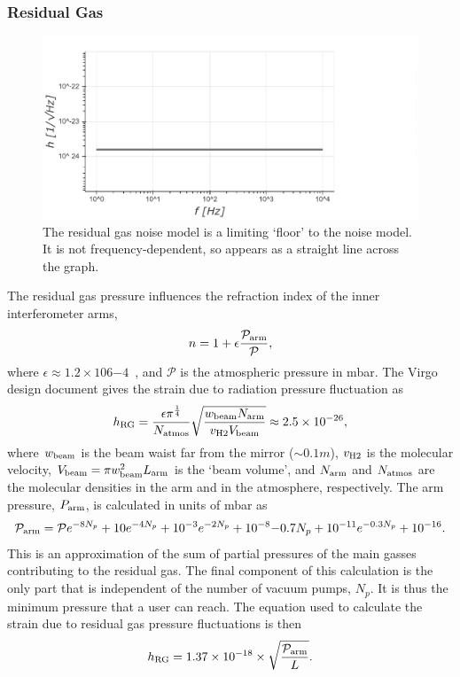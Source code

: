 \documentclass{article}
\begin{document}
     \subsubsection*{Residual Gas} 
    \begin{figure}[h!]
    \centering
    \hspace{2cm}
    \includegraphics[height=0.35\textwidth]{SPQ_residualgas.pdf}
    \caption{The residual gas noise model is a limiting `floor' to the
      noise model. It is not frequency-dependent, so appears as a
      straight line across the graph.}
    \label{fig:residual}
    \end{figure}
    The residual gas pressure influences the refraction index of the inner interferometer arms, 
    \begin{equation}
    n = 1 + \epsilon\frac{\mathcal{P}_{\rm arm}}{\mathcal{P}},
    \end{equation}
    where $\epsilon \approx 1.2\times 10 6{-4}$~\cite{Virgo-sens}, and
    $\mathcal{P}$ is the atmospheric pressure in mbar. The Virgo
    design document gives the strain due to radiation pressure
    fluctuation as
    \begin{equation}
    h_{\rm RG} = \frac{\epsilon\pi^{\frac{1}{4}}}{N_{\rm atmos}}\sqrt{\frac{w_{\rm beam}N_{\rm arm}}{v_{\rm H2}V_{\rm beam}}} \approx 2.5 \times 10^{-26},
    \end{equation}
    where $w_{\rm beam}$ is the beam waist far from the mirror ($\sim
    0.1m$), $v_{\rm H2}$ is the molecular velocity, $V_{\rm beam} = \pi
    w_{\rm beam}^2L_{\rm arm}$ is the `beam volume', and $N_{\rm arm}$ and
    $N_{\rm atmos}$ are the molecular densities in the arm and in the
    atmosphere, respectively.
    The arm pressure, $P_{\rm arm}$, is calculated in units of mbar as
    \begin{equation}
    \label{eq:pressure}
    \mathcal{P}_{\rm arm} = \mathcal{P}e^{-8N_p} + 10e^{-4N_p} + 10^{-3}e^{-2N_p} + 10^{-8}{-0.7N_p} + 10^{-11}e^{-0.3N_p} + 10^{-16}.
    \end{equation}
   This is an approximation of the sum of partial pressures of the
   main gasses contributing to the residual gas. The final component
   of this calculation is the only part that is independent of the
   number of vacuum pumps, $N_p$. It is thus the minimum pressure that
   a user can reach.
    The equation used to calculate the strain due to residual gas
    pressure fluctuations is then
    \begin{equation}
        \label{eqn::residual} 
        h_{\rm RG} = 1.37 \times 10^{-18} \times \sqrt{\frac{\mathcal{P}_{\rm arm}}{L}}.
    \end{equation}
\end{document}
